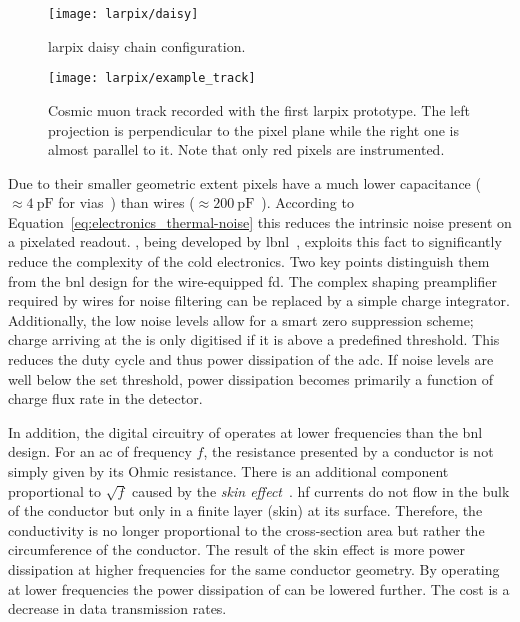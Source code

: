 \begin{figure}[htb]
	\centering
	\texttt{[image: larpix/daisy]}
	\caption[ daisy chain]{%
		\acrshort{larpix} daisy chain configuration.~\cite{larpix_spec}
	}
	\label{fig:larpix_daisy}
\end{figure}

\begin{figure}[htb]
	\centering
	\texttt{[image: larpix/example\_track]}
	\caption[ prototype event]{%
		Cosmic muon track recorded with the first \acrshort{larpix} prototype.
		The left projection is perpendicular to the pixel plane while the right one is almost parallel to it.
		Note that only red pixels are instrumented.~\cite{danLarpix}
	}
	\label{fig:larpix_track}
\end{figure}

Due to their smaller geometric extent pixels have a much lower capacitance ($\approx \SI{4}{\pico\farad}$ for vias~\cite{larpix_spec}) than wires ($\approx \SI{200}{\pico\farad}$~\cite{protodune-sp}).
According to Equation~\eqref{eq:electronics_thermal-noise} this reduces the intrinsic noise present on a pixelated readout.
\larpix{}, being developed by \gls{lbnl}~\cite{larpix, larpix_spec}, exploits this fact to significantly reduce the complexity of the cold electronics.
Two key points distinguish them from the \gls{bnl} design for the wire-equipped \gls{fd}.
The complex shaping preamplifier required by wires for noise filtering can be replaced by a simple charge integrator.
Additionally, the low noise levels allow for a smart zero suppression scheme; charge arriving at the \larpix{} is only digitised if it is above a predefined threshold.
This reduces the duty cycle and thus power dissipation of the \gls{adc}.
If noise levels are well below the set threshold, power dissipation becomes primarily a function of charge flux rate in the detector.

In addition, the digital circuitry of \larpix{} operates at lower frequencies than the \gls{bnl} design.
For an \gls{ac} of frequency $f$, the resistance presented by a conductor is not simply given by its Ohmic resistance.
There is an additional component proportional to $\sqrt{f}$ caused by the \emph{skin effect}~\cite{horowitzHill}.
\gls{hf} currents do not flow in the bulk of the conductor but only in a finite layer (skin) at its surface.
Therefore, the conductivity is no longer proportional to the cross-section area but rather the circumference of the conductor.
The result of the skin effect is more power dissipation at higher frequencies for the same conductor geometry.
By operating at lower frequencies the power dissipation of \larpix{} can be lowered further.
The cost is a decrease in data transmission rates.

